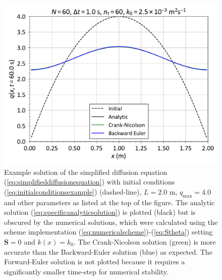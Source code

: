 \documentclass[12pt]{article}
\begin{document}
\begin{figure}[b]
\centering
\includegraphics[width=0.7\linewidth]{example_plot.pdf}
\caption{Example solution of the simplified diffusion equation (\ref{eq:simplifieddiffusionequation}) with initial conditions (\ref{eq:initialconditionsexample}) (dashed-line), $L=2.0$ m, $q_\mathrm{max}=4.0$ and other parameters as listed at the top of the figure. The analytic solution (\ref{eq:specificanalyticsolution}) is plotted (black) but is obscured by the numerical solutions, which were calculated using the scheme implementation (\ref{eq:numericalscheme})-(\ref{eq:Stheta}) setting $\mathbf{S}=0$ and $k(x)=k_0$. The Crank-Nicolson solution (green) is more accurate than the Backward-Euler solution (blue) as expected. The Forward-Euler solution is not plotted because it requires a significantly smaller time-step for numerical stability.}
\label{fig:example}
\end{figure} 
\end{document}

